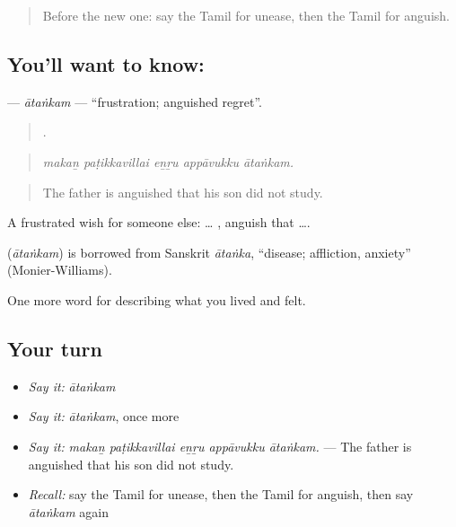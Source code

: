 \label{lesson:TA-C455-atankam}



\begin{quote}
Before the new one: say the Tamil for unease, then the Tamil for anguish.
\end{quote}

\subsection*{You'll want to know: }
\textbf{} — \emph{ātaṅkam} — \textquotedblleft{}frustration; anguished regret\textquotedblright{}.

\begin{quote}
    .
\end{quote}

\begin{quote}
\emph{makaṉ paṭikkavillai eṉṟu appāvukku ātaṅkam.}
\end{quote}

\begin{quote}
The father is anguished that his son did not study.
\end{quote}

A frustrated wish for someone else: …  , anguish that ….

\begin{cousinweb}
\textbf{} (\emph{ātaṅkam}) is borrowed from Sanskrit \emph{ātaṅka}, \textquotedblleft{}disease; affliction, anxiety\textquotedblright{} (Monier-Williams).
\end{cousinweb}

\begin{grammarlens}[title={What you've built}]
One more word for describing what you lived and felt.
\end{grammarlens}

\subsection*{Your turn}
\begin{itemize}
\raggedright
  \item \emph{Say it:} \emph{ātaṅkam}
  \item \emph{Say it:} \emph{ātaṅkam}, once more
  \item \emph{Say it:} \emph{makaṉ paṭikkavillai eṉṟu appāvukku ātaṅkam.} — The father is anguished that his son did not study.
  \item \emph{Recall:} say the Tamil for unease, then the Tamil for anguish, then say \emph{ātaṅkam} again
\end{itemize}

